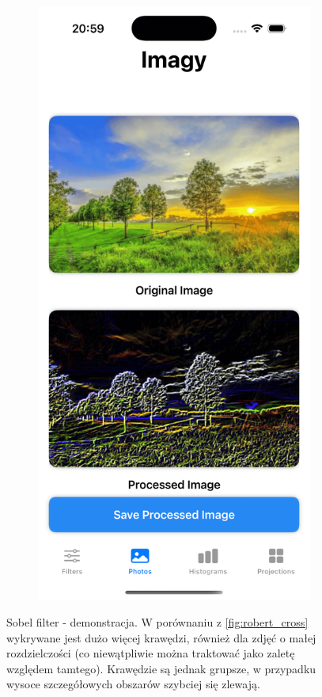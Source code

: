 \documentclass[a4paper]{article}
\begin{document}
\begin{figure}[H]
\begin{subfigure}{0.2\textwidth}
        \label{fig:barn_sobel}
    \end{subfigure}
    \hfill
    \begin{subfigure}{0.2\textwidth}
        \centering
        \includegraphics[width=\linewidth]{images/trees_sobel.png}
        \label{fig:trees_sobel}
    \end{subfigure}
    \caption{Sobel filter - demonstracja. W porównaniu z \ref{fig:robert_cross} wykrywane jest dużo więcej krawędzi, również dla zdjęć o małej rozdzielczości (co niewątpliwie można traktować jako zaletę względem tamtego). Krawędzie są jednak grupsze, w przypadku wysoce szczegółowych obszarów szybciej się zlewają.}
    \label{fig:sobel}
\end{figure}
\end{document}
